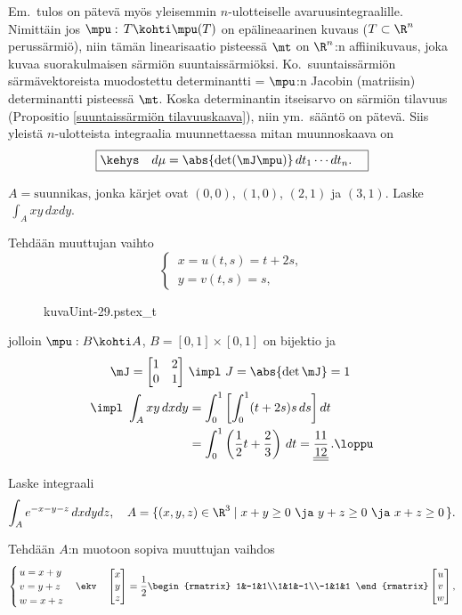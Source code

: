 Em.\  tulos on pätevä myös yleisemmin $n$-ulotteiselle avaruusintegraalille. Nimittäin jos
$\mpu:\,T \kohti \mpu(T)$ on epälineaarinen kuvaus ($T\subset\R^n$ perussärmiö), niin tämän
linearisaatio pisteessä $\mt$ on $\R^n$:n affiinikuvaus, joka kuvaa suorakulmaisen särmiön
suuntaissärmiöksi. Ko.\ suuntaissärmiön särmävektoreista muodostettu determinantti = $\mpu$:n
Jacobin (matriisin) determinantti pisteessä $\mt$. Koska determinantin itseisarvo on särmiön
tilavuus (Propositio \ref{suuntaissärmiön tilavuuskaava}), niin ym.\ sääntö on pätevä. Siis
yleistä $n$-ulotteista integraalia muunnettaessa mitan muunnoskaava on
\[
\boxed{\kehys\quad d\mu=\abs{\det(\mJ\mpu)}\,dt_1\cdots dt_n. \quad}
\]
\begin{Exa}
$A=\text{suunnikas}$, jonka kärjet ovat $(0,0)$, $(1,0)$, $(2,1)$ ja $(3,1)$. 
Laske $\,\int_A xy\,dxdy$.
\end{Exa}
\begin{multicols}{2} \raggedcolumns
\ratk Tehdään muuttujan vaihto
\[
\begin{cases}
\,x=u(t,s)=t+2s, \\
\,y=v(t,s)=s,
\end{cases}
\]
\begin{figure}[H]
\begin{center}
{kuvaUint-29.pstex_t}
\end{center}
\end{figure}
\end{multicols}
jolloin $\mpu: B \kohti A$, $B=[0,1]\times [0,1]$ on bijektio ja
\begin{align*}
\mJ=\begin{bmatrix} 1 & 2 \\ 0 & 1 \end{bmatrix} \ &\impl \ J=\abs{\det\mJ}=1 \\
\impl \ \int_A xy\,dxdy &= \int_0^1\left[\int_0^1 (t+2s)s\,ds\right]dt \\
                        &= \int_0^1 \left(\frac{1}{2}t+\frac{2}{3}\right)\,dt
                         = \underline{\underline{\frac{11}{12}}}\,. \loppu
\end{align*}
\begin{Exa} Laske integraali
\[ 
\int_A e^{-x-y-z}\,dxdydz, \quad 
         A = \{(x,y,z) \in \R^3 \mid x+y \ge 0\ \ja\ y+z \ge 0\ \ja\ x+z \ge 0\,\}. 
\]
\end{Exa}
\ratk Tehdään $A$:n muotoon sopiva muuttujan vaihdos
\[
\begin{cases} \,u = x+y \\ \,v = y+z \\ \,w = x+z \end{cases} 
    \ekv\quad \begin{bmatrix} x\\y\\z \end{bmatrix} =
              \frac{1}{2} \begin{rmatrix} 1&-1&1\\1&1&-1\\-1&1&1 \end{rmatrix}
              \begin{bmatrix} u\\v\\w \end{bmatrix},
\]
